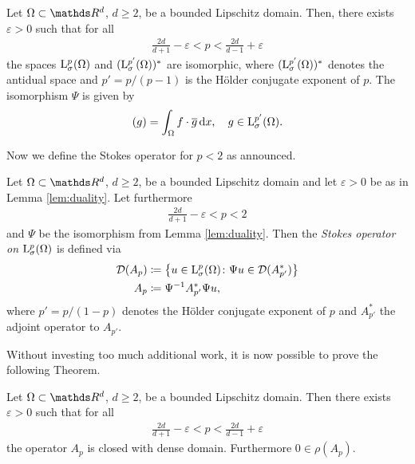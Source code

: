 \begin{lem}
  \label{lem:duality}
  Let $\Omega \subset \R^d$, $d \geq 2$, be a bounded Lipschitz domain.
  Then, there exists $\varepsilon > 0$ such that for all 
  \begin{align*}
    \frac{2d}{d + 1} - \varepsilon < p < \frac{2d}{d - 1} + \varepsilon
  \end{align*}
  the spaces $\mathrm{L}^p_\sigma(\Omega)$ and $(\mathrm{L}^{p'}_\sigma(\Omega))^*$ are isomorphic, where $(\mathrm{L}^{p'}_\sigma(\Omega))^*$ denotes the antidual space and $p' = p/ (p - 1)$  is the Hölder conjugate exponent of $p$. 
  The isomorphism $\Psi$ is given by
  \begin{align*}
    [\Psi f](g) = \int_\Omega f \cdot \overline g  \d x, \quad g \in \Ell^{p'}_\sigma(\Omega).
  \end{align*}
\end{lem}

Now we define the Stokes operator for $p < 2$ as announced.

\begin{defn}
  Let $\Omega \subset \R^d$, $d \geq 2$, be a bounded Lipschitz domain and let $\varepsilon > 0$ be as in Lemma \ref{lem:duality}.
  Let furthermore
  \begin{align*}
    \frac{2d}{d + 1} - \varepsilon < p < 2
  \end{align*}
  and $\Psi$ be the isomorphism from Lemma \ref{lem:duality}.
  Then the \emph{Stokes operator on} $\mathrm{L}^p_\sigma(\Omega)$ is defined via
  \begin{align*}
    \mathcal{D}(A_p) & \coloneqq \big\{ u \in \mathrm{L}^p_\sigma(\Omega) \colon \Psi u \in \mathcal{D}(A^*_{p'}) \big\} \\
    A_p &\coloneqq \Psi^{-1} A^*_{p'} \Psi u,
  \end{align*}
  where $p' = p/(1 - p)$ denotes the Hölder conjugate exponent of $p$ and $A^*_{p'}$ the adjoint operator to $A_{p'}$.
\end{defn}

Without investing too much additional work, it is now possible to prove the following Theorem.

\begin{thm}
  \label{thm:stokesOperatorLp}
  Let $\Omega \subset \R^d$, $d \geq 2$, be a bounded Lipschitz domain. 
  Then there exists $\varepsilon > 0$ such that for all 
  \begin{align*}
    \frac{2d}{d + 1} - \varepsilon < p < \frac{2d}{d - 1} + \varepsilon
  \end{align*}
  the operator $A_p$ is closed with dense domain. Furthermore $0 \in \rho(A_p)$.
\end{thm}

